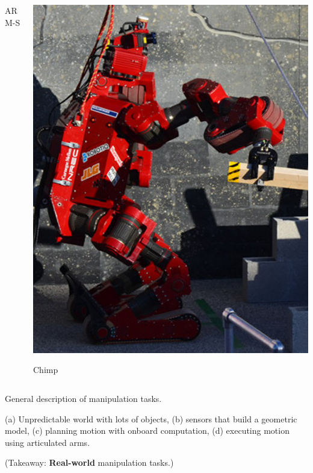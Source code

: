 \documentclass[serif]{beamer}
\begin{document}
\begin{frame}
\begin{columns}
\begin{column}{0.33\textwidth}
\begin{center}
      ARM-S
   \end{center}
   \end{column}%
   \begin{column}{0.33\textwidth}
   \begin{center}
      \includegraphics[width=\columnwidth]{images/chimp.jpg}
      
      Chimp
   \end{center}
   \end{column}
   \end{columns}

   General description of manipulation tasks.

   (a) Unpredictable world with lots of objects,
   (b) sensors that build a geometric model,
   (c) planning motion with onboard computation,
   (d) executing motion using articulated arms.

   (Takeaway: {\bf Real-world} manipulation tasks.)

\end{frame}
\end{document}
